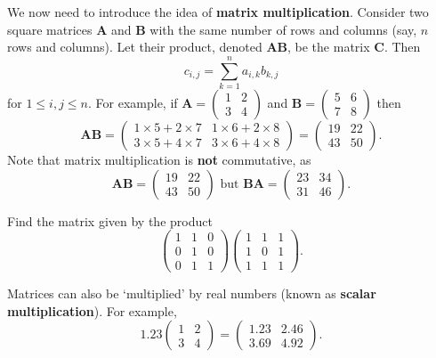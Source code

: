 We now need to introduce the idea of \textbf{matrix multiplication}. Consider two square matrices \textbf{A} and \textbf{B} with the same number of rows and columns (say, $n$ rows and columns). Let their product, denoted \textbf{AB}, be the matrix \textbf{C}. Then
\[
    c_{i,j} = \sum_{k=1}^n a_{i,k}b_{k,j}
\]
for $1 \leq i, j \leq n$. For example, if $\textbf{A} = \begin{pmatrix}1 & 2\\3 & 4\end{pmatrix}$ and $\textbf{B} = \begin{pmatrix}5 & 6\\7 & 8\end{pmatrix}$ then
\[
    \textbf{AB} = \begin{pmatrix}1\times5+2\times7 & 1\times6+2\times8\\3\times5+4\times7 & 3\times6+4\times8\end{pmatrix}
    = \begin{pmatrix}19 & 22\\43 & 50\end{pmatrix}.
\]
Note that matrix multiplication is \textbf{not} commutative, as
\[
    \textbf{AB} = \begin{pmatrix}19 & 22\\43 & 50\end{pmatrix} \text{ but } \textbf{BA} = \begin{pmatrix}23 & 34\\31 & 46\end{pmatrix}.
\]

\begin{exercise}
    Find the matrix given by the product
    \[
        \begin{pmatrix}1&1&0\\0&1&0\\0&1&1\end{pmatrix}\begin{pmatrix}1&1&1\\1&0&1\\1&1&1\end{pmatrix}.
    \]
\end{exercise}

Matrices can also be `multiplied' by real numbers (known as \textbf{scalar multiplication}). For example,
\[
    1.23\begin{pmatrix}1 & 2\\3 & 4\end{pmatrix} = \begin{pmatrix}1.23 & 2.46\\3.69 & 4.92\end{pmatrix}.
\]

